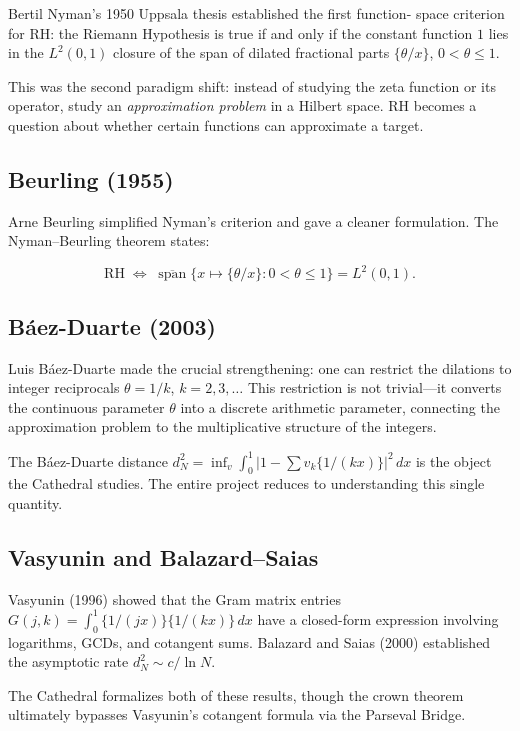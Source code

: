 \documentclass[11pt,a4paper]{article}
\newcommand{\RH}{\ensuremath{\mathrm{RH}}}
\begin{document}
Bertil Nyman's 1950 Uppsala thesis established the first function-
space criterion for RH: the Riemann Hypothesis is true if and only
if the constant function $1$ lies in the $L^2(0,1)$ closure of the
span of dilated fractional parts $\{\theta/x\}$, $0 < \theta \leq 1$.

This was the second paradigm shift: instead of studying the zeta
function or its operator, study an \emph{approximation problem}
in a Hilbert space. RH becomes a question about whether certain
functions can approximate a target.

\subsection{Beurling (1955)}

Arne Beurling simplified Nyman's criterion and gave a cleaner
formulation. The Nyman--Beurling theorem states:

\[
  \RH \;\iff\;
  \overline{\operatorname{span}}\{x \mapsto \{\theta/x\} :
  0 < \theta \leq 1\} = L^2(0,1).
\]

\subsection{B\'aez-Duarte (2003)}

Luis B\'aez-Duarte made the crucial strengthening: one can restrict
the dilations to integer reciprocals $\theta = 1/k$, $k = 2, 3,
\ldots$ This restriction is not trivial---it converts the
continuous parameter $\theta$ into a discrete arithmetic parameter,
connecting the approximation problem to the multiplicative structure
of the integers.

The B\'aez-Duarte distance $d_N^2 = \inf_v \int_0^1 |1 - \sum v_k
\{1/(kx)\}|^2\,dx$ is the object the Cathedral studies. The entire
project reduces to understanding this single quantity.

\subsection{Vasyunin and Balazard--Saias}

Vasyunin (1996) showed that the Gram matrix entries $G(j,k) =
\int_0^1 \{1/(jx)\}\{1/(kx)\}\,dx$ have a closed-form expression
involving logarithms, GCDs, and cotangent sums. Balazard and Saias
(2000) established the asymptotic rate $d_N^2 \sim c/\ln N$.

The Cathedral formalizes both of these results, though the crown
theorem ultimately bypasses Vasyunin's cotangent formula via the
Parseval Bridge.
\end{document}
